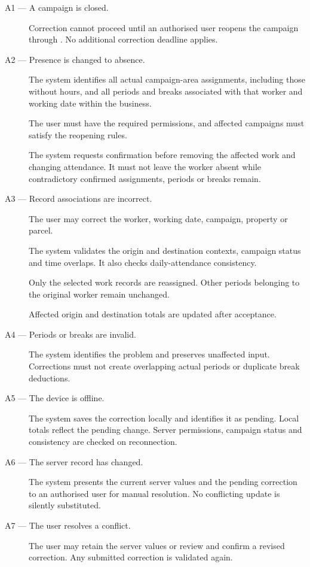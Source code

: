 \begin{description}

    \item[A1 --- A campaign is closed.]
    Correction cannot proceed until
    an authorised user reopens the campaign
    through .
    No additional correction deadline applies.

    \item[A2 --- Presence is changed to absence.]
    The system identifies all actual campaign-area assignments,
    including those without hours, and all periods and breaks
    associated with that worker and working date within the business.

    The user must have the required permissions,
    and affected campaigns must satisfy
    the reopening rules.

    The system requests confirmation before
    removing the affected work and changing attendance.
    It must not leave the worker absent
    while contradictory confirmed assignments, periods or breaks remain.

    \item[A3 --- Record associations are incorrect.]
    The user may correct the worker, working date,
    campaign, property or parcel.

    The system validates the origin and destination
    contexts, campaign status and time overlaps.
    It also checks daily-attendance consistency.

    Only the selected work records are reassigned.
    Other periods belonging to the original worker
    remain unchanged.

    Affected origin and destination totals
    are updated after acceptance.

    \item[A4 --- Periods or breaks are invalid.]
    The system identifies the problem
    and preserves unaffected input.
    Corrections must not create overlapping
    actual periods or duplicate break deductions.

    \item[A5 --- The device is offline.]
    The system saves the correction locally
    and identifies it as pending.
    Local totals reflect the pending change.
    Server permissions, campaign status
    and consistency are checked on reconnection.

    \item[A6 --- The server record has changed.]
    The system presents the current server values
    and the pending correction to an authorised
    user for manual resolution.
    No conflicting update is silently substituted.

    \item[A7 --- The user resolves a conflict.]
    The user may retain the server values
    or review and confirm a revised correction.
    Any submitted correction is validated again.
\end{description}

